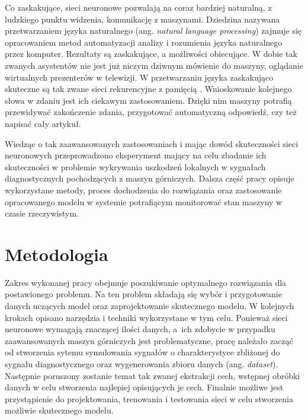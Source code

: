\documentclass[inzynierska]{pwr_wmat_praca_dyplomowa}
\theoremstyle{plain}
\numberwithin{theorem}{chapter}
\theoremstyle{definition}
\numberwithin{theorem}{chapter}
\begin{document}
Co zaskakujące, sieci neuronowe pozwalają na coraz bardziej naturalną, z ludzkiego punktu widzenia, komunikację z maszynami. Dziedzina nazywana przetwarzaniem języka naturalnego (ang. \textit{natural language processing}) zajmuje się opracowaniem metod automatyzacji analizy i rozumienia języka naturalnego przez komputer\cite{nnspeech}. Rezultaty są zaskakujące, a możliwości obiecujące. W dobie tak zwanych asystentów nie jest już niczym dziwnym mówienie do maszyny, oglądanie wirtualnych prezenterów w telewizji. W przetwarzaniu języka zaskakująco skuteczne są tak zwane sieci rekurencyjne z pamięcią \cite{tai2015improved}.  Wnioskowanie kolejnego słowa w zdaniu jest ich ciekawym zastosowaniem. Dzięki nim maszyny potrafią przewidywać zakończenie zdania\cite{nngboard}, przygotować automatyczną odpowiedź, czy też napisać cały artykuł.

Wiedząc o tak zaawansowanych zastosowaniach i mając dowód skuteczności sieci neuronowych przeprowadzono eksperyment mający na celu zbadanie ich skuteczności w problemie wykrywania uszkodzeń lokalnych w sygnałach diagnostycznych pochodzących z maszyn górniczych. Dalsza część pracy opisuje wykorzystane metody, proces dochodzenia do rozwiązania oraz zastosowanie opracowanego modelu w systemie potrafiącym monitorować stan maszyny w czasie rzeczywistym.

\chapter{Metodologia}
\label{chap:meto}
Zakres wykonanej pracy obejmuje poszukiwanie optymalnego rozwiązania dla postawionego problemu. Na ten problem składają się wybór i przygotowanie danych uczących model oraz zaprojektowanie skutecznego modelu. 
W kolejnych krokach opisano narzędzia i techniki wykorzystane w tym celu. Ponieważ sieci neuronowe wymagają znaczącej ilości danych, a~ich zdobycie w przypadku zaawansowanych maszyn górniczych jest problematyczne, pracę należało zacząć od stworzenia sytemu symulowania sygnałów o charakterystyce zbliżonej do sygnału diagnostycznego oraz wygenerowania zbioru danych (ang. \textit{dataset}). Następnie poruszony zostanie temat tak zwanej ekstrakcji cech, wstępnej obróbki danych w celu stworzenia najlepiej opisujących je cech. Finalnie możliwe jest przystąpienie do projektowania, trenowania i testowania sieci w celu stworzenia możliwie skutecznego modelu.
\end{document}

